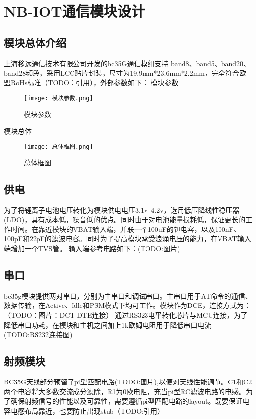 
\chapter{NB-IOT通信模块设计}
\section{模块总体介绍}

上海移远通信技术有限公司开发的bc35G通信模组支持 band8、band5、band20、band28频段，采用LCC贴片封装，尺寸为19.9mm*23.6mm*2.2mm，完全符合欧盟RoHs标准（TODO：引用），外部参数如下：
模块参数

\begin{figure}[h]
	\texttt{[image: 模块参数.png]}
	\caption{模块参数}
	\label{模块参数}
\end{figure}

模块总体

\begin{figure}[h]
    \floatcontinue
	\texttt{[image: 总体框图.png]}
	\caption{总体框图}
	\label{总体框图}
\end{figure}


\section{供电}
为了将锂离子电池电压转化为模块供电电压3.1v~4.2v，选用低压降线性稳压器(LDO)，具有成本低，噪音低的优点。同时由于对电池能量损耗低，保证更长的工作时间。在靠近模块的VBAT输入端，并联一个100uF的钽电容，以及100nF、100pF和22pF的滤波电容。同时为了提高模块承受浪涌电压的能力，在VBAT输入端增加一个TVS管。
输入端参考电路如下：(TODO:图片)

\section{串口}
bc35g模块提供两对串口，分别为主串口和调试串口。主串口用于AT命令的通信、数据传输，在Active、Idle和PSM模式下均可工作。模块作为DCE，连接方式为：（TODO：图片：DCT-DTE连接）
通过RS323电平转化芯片与MCU连接，为了降低串口功耗，在模块和主机之间加上1k欧姆电阻用于降低串口电流(TODO:RS232连接图)

\section{射频模块}
BC35G天线部分预留了pi型匹配电路(TODO:图片),以便对天线性能调节。C1和C2两个电容将大多数交流成分滤除，R1为0欧电阻，充当pi型RC滤波电路的电感。为了确保射频信号的性能以及可靠性，需要遵循pi型匹配电路的layout。既要保证电容电感布局靠近，也要防止出现stub（TODO:引用）

